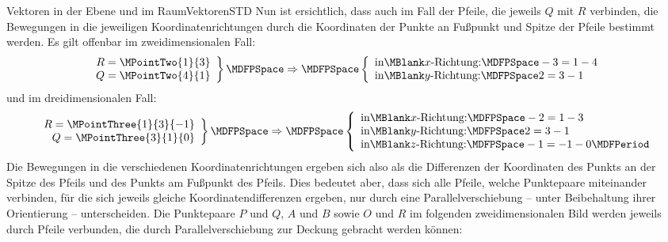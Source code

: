 \begin{MXContent}{Vektoren in der Ebene und im Raum}{Vektoren}{STD}
Nun ist ersichtlich, dass auch im Fall der Pfeile, die jeweils $Q$ mit $R$ verbinden, die Bewegungen in die jeweiligen Koordinatenrichtungen durch die Koordinaten der Punkte an Fußpunkt und Spitze der Pfeile bestimmt werden. Es gilt offenbar im zweidimensionalen Fall:
\[
 \left.\begin{array}{r}R=\MPointTwo{1}{3} \\ Q=\MPointTwo{4}{1}\end{array}\right\}\MDFPSpace\Rightarrow\MDFPSpace\left\{\begin{array}{l}\textrm{in}\MBlank x\textrm{-Richtung:}\MDFPSpace-3=1-4 \\ \textrm{in}\MBlank y\textrm{-Richtung:}\MDFPSpace2=3-1\end{array}\right.
\]
und im dreidimensionalen Fall:
\[
 \left.\begin{array}{r}R=\MPointThree{1}{3}{-1} \\ Q=\MPointThree{3}{1}{0}\end{array}\right\}\MDFPSpace\Rightarrow\MDFPSpace\left\{\begin{array}{l}\textrm{in}\MBlank x\textrm{-Richtung:}\MDFPSpace-2=1-3 \\ \textrm{in}\MBlank y\textrm{-Richtung:}\MDFPSpace2=3-1 \\ \textrm{in}\MBlank z\textrm{-Richtung:}\MDFPSpace-1=-1-0\MDFPeriod\end{array}\right.
\]
Die Bewegungen in die verschiedenen Koordinatenrichtungen ergeben sich also als die Differenzen der Koordinaten des Punkts an der Spitze des Pfeils und des Punkts am Fußpunkt des Pfeils. Dies bedeutet aber, dass sich alle Pfeile, welche Punktepaare miteinander verbinden, für die sich jeweils gleiche Koordinatendifferenzen ergeben, nur durch eine Parallelverschiebung -- unter Beibehaltung ihrer Orientierung -- unterscheiden. Die Punktepaare $P$ und $Q$, $A$ und $B$ sowie $O$ und $R$ im folgenden zweidimensionalen Bild werden jeweils durch Pfeile verbunden, die durch Parallelverschiebung zur Deckung gebracht werden können:
\begin{center}
\end{center}
\end{MXContent}
